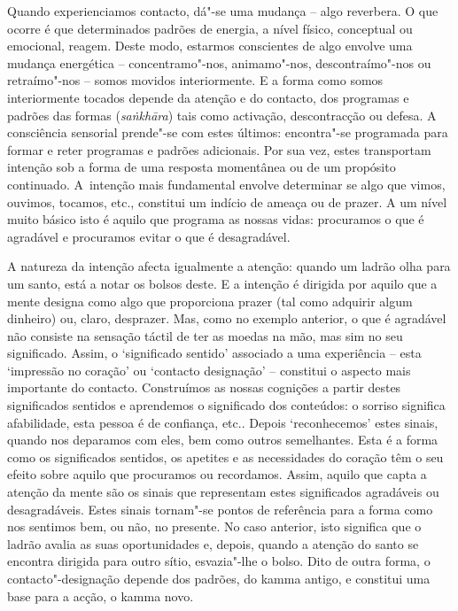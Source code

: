 Quando experienciamos contacto, dá"-se uma mudança -- algo reverbera. O que
ocorre é que determinados padrões de energia, a nível físico, conceptual ou
emocional, reagem. Deste modo, estarmos conscientes de algo envolve uma mudança
energética -- concentramo"-nos, animamo"-nos, descontraímo"-nos ou retraímo"-nos --
somos movidos interiormente. E a forma como somos interiormente tocados depende
da atenção e do contacto, dos programas e padrões das formas (\emph{saṅkhāra})
tais como activação, descontracção ou defesa. A consciência sensorial prende"-se
com estes últimos: encontra"-se programada para formar e reter programas e
padrões adicionais. Por sua vez, estes transportam intenção sob a forma de uma
resposta momentânea ou de um propósito continuado. A~intenção mais fundamental
envolve determinar se algo que vimos, ouvimos, tocamos, etc., constitui um
indício de ameaça ou de prazer. A um nível muito básico isto é aquilo que
programa as nossas vidas: procuramos o que é agradável e procuramos evitar o que
é desagradável.

A natureza da intenção afecta igualmente a atenção: quando um ladrão olha para
um santo, está a notar os bolsos deste. E a intenção é dirigida por aquilo que a
mente designa como algo que proporciona prazer (tal como adquirir algum
dinheiro) ou, claro, desprazer. Mas, como no exemplo anterior, o que é agradável
não consiste na sensação táctil de ter as moedas na mão, mas sim no seu
significado. Assim, o `significado sentido' associado a uma experiência -- esta
`impressão no coração' ou `contacto designação' -- constitui o aspecto mais
importante do contacto. Construímos as nossas cognições a partir destes
significados sentidos e aprendemos o significado dos conteúdos: o sorriso
significa afabilidade, esta pessoa é de confiança, etc.. Depois `reconhecemos'
estes sinais, quando nos deparamos com eles, bem como outros semelhantes. Esta é
a forma como os significados sentidos, os apetites e as necessidades do coração
têm o seu efeito sobre aquilo que procuramos ou recordamos. Assim, aquilo que
capta a atenção da mente são os sinais que representam estes significados
agradáveis ou desagradáveis. Estes sinais tornam"-se pontos de referência para a
forma como nos sentimos bem, ou não, no presente. No caso anterior, isto
significa que o ladrão avalia as suas oportunidades e, depois, quando a atenção
do santo se encontra dirigida para outro sítio, esvazia"-lhe o bolso. Dito de
outra forma, o contacto"-designação depende dos padrões, do kamma antigo, e
constitui uma base para a acção, o kamma novo.

